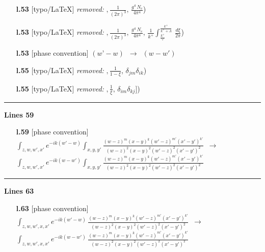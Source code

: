 \documentclass[10pt]{article}
\begin{document}
\begin{itemize}[leftmargin=2.2em,itemsep=1pt,topsep=2pt]
\item[\textbf{l.53}] \textsf{\small [typo/LaTeX]} \emph{removed:} $\displaystyle ,$$\displaystyle \frac{1}{(2\pi)^{3}},\,\frac{g^{4}\,N_{c}}{4\pi^{4}}${\color{gray}\small)}
\item[\textbf{l.53}] \textsf{\small [typo/LaTeX]} \emph{removed:} $\displaystyle ,$$\displaystyle \frac{1}{(2\pi)^{3}},\,\frac{g^{4}\,N_{c}}{4\pi^{4}},\,\frac{1}{k^{+}}\int_{\frac{k^{+}}{\vee}}^{\frac{k^{+}}{k^{+}+\Lambda}}\,\frac{d\xi}{2\pi}${\color{gray}\small)}
\item[\textbf{l.53}] \textsf{\small [phase convention]} $\displaystyle (w’-w)$\ $\longrightarrow$\ $\displaystyle (w-w')$
\item[\textbf{l.55}] \textsf{\small [typo/LaTeX]} \emph{removed:} $\displaystyle ,$$\displaystyle \frac{1}{1-\xi},\,\delta_{jm}\delta_{ik}${\color{gray}\small)}
\item[\textbf{l.55}] \textsf{\small [typo/LaTeX]} \emph{removed:} $\displaystyle ,$$\displaystyle \frac{1}{\xi},\,\delta_{im}\delta_{kj}\Big]${\color{gray}\small)}
\end{itemize}
\noindent\rule{\linewidth}{0.3pt}\par\noindent\textbf{Lines 59} \par
\begin{itemize}[leftmargin=2.2em,itemsep=1pt,topsep=2pt]
\item[\textbf{l.59}] \textsf{\small [phase convention]} $\displaystyle \int_{z,w,w',x'}e^{-ik(w'-w)}\int_{x,y,y'}\frac{(w-z)^{m}(x-y)^{k}(w'-z)^{m'}(x'-y')^{k'}}{(w-z)^{2}(x-y)^{2}(w'-z)^{2}(x'-y')^{2}}$\ $\longrightarrow$\ $\displaystyle \int_{z,w,w',x'}e^{-ik(w-w')}\int_{x,y,y'}\frac{(w-z)^{m}(x-y)^{k}(w'-z)^{m'}(x'-y')^{k'}}{(w-z)^{2}(x-y)^{2}(w'-z)^{2}(x'-y')^{2}}$
\end{itemize}
\noindent\rule{\linewidth}{0.3pt}\par\noindent\textbf{Lines 63} \par
\begin{itemize}[leftmargin=2.2em,itemsep=1pt,topsep=2pt]
\item[\textbf{l.63}] \textsf{\small [phase convention]} $\displaystyle \int_{z,w,w',x,x'}e^{-ik(w'-w)}\,\frac{(w-z)^{m}(x-y)^{k}(w'-z)^{m'}(x'-y')^{k'}}{(w-z)^{2}(x-y)^{2}(w'-z)^{2}(x'-y')^{2}}$\ $\longrightarrow$\ $\displaystyle \int_{z,w,w',x,x'}e^{-ik(w-w')}\,\frac{(w-z)^{m}(x-y)^{k}(w'-z)^{m'}(x'-y')^{k'}}{(w-z)^{2}(x-y)^{2}(w'-z)^{2}(x'-y')^{2}}$
\end{itemize}
\end{document}
